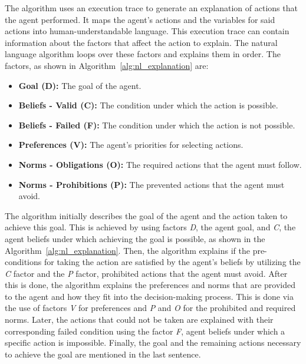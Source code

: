 \documentclass[sigconf,nonacm]{acmart}
\begin{document}
The algorithm uses an execution trace to generate an explanation of actions that the agent performed. It maps the agent's actions and the variables for said actions into human-understandable language. This execution trace can contain information about the factors that affect the action to explain. The natural language algorithm loops over these factors and explains them in order. The factors, as shown in Algorithm~\ref{alg:nl_explanation} are:

\begin{itemize}
    \item \textbf{Goal (D):} The goal of the agent.
    \item \textbf{Beliefs - Valid (C):} The condition under which the action is possible.
    \item \textbf{Beliefs - Failed (F):} The condition under which the action is not possible.
    \item \textbf{Preferences (V):} The agent's priorities for selecting actions.
    \item \textbf{Norms - Obligations (O):} The required actions that the agent must follow.
    \item \textbf{Norms - Prohibitions (P):} The prevented actions that the agent must avoid.
\end{itemize}




The algorithm initially describes the goal of the agent and the action taken to achieve this goal. This is achieved by using factors \textit{D}, the agent goal, and \textit{C}, the agent beliefs under which achieving the goal is possible, as shown in the Algorithm~\ref{alg:nl_explanation}. Then, the algorithm explains if the pre-conditions for taking the action are satisfied by the agent's beliefs by utilizing the \textit{C} factor and the \textit{P} factor, prohibited actions that the agent must avoid. After this is done, the algorithm explains the preferences and norms that are provided to the agent and how they fit into the decision-making process. This is done via the use of factors \textit{V} for preferences and \textit{P} and \textit{O} for the prohibited and required norms. Later, the actions that could not be taken are explained with their corresponding failed condition using the factor \textit{F}, agent beliefs under which a specific action is impossible. Finally, the goal and the remaining actions necessary to achieve the goal are mentioned in the last sentence.
\end{document}
